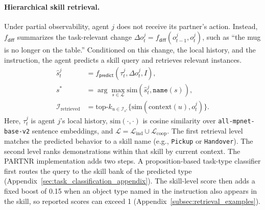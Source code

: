 \documentclass{article}
\theoremstyle{plain}
\theoremstyle{definition}
\theoremstyle{remark}
\begin{document}
\paragraph{Hierarchical skill retrieval.}
Under partial observability, agent $j$ does not receive its partner's action. Instead, $f_{\mathsf{diff}}$ summarizes the task-relevant change $\Delta o_t^j=f_{\mathsf{diff}}(o_{t-1}^j,o_t^j)$, such as ``the mug is no longer on the table.'' Conditioned on this change, the local history, and the instruction, the agent predicts a skill query and retrieves relevant instances.
\begin{equation}
\begin{aligned}
\hat{s}_t^j &= f_{\mathsf{predict}}(\tau_t^j, \Delta o_{t}^j, I), \\
s^* &= \arg\max_{s \in \mathcal{L}} \text{sim}(\hat{s}^j_t, \texttt{name}(s)), \\
\mathcal{I}_{\text{retrieved}} &= \text{top-}k_{u \in \mathcal{I}_{s^*}}
\{\text{sim}(\text{context}(u), o^j_t)\}.
\end{aligned}
\end{equation}
Here, $\tau_t^j$ is agent $j$'s local history, $\text{sim}(\cdot,\cdot)$ is cosine similarity over \texttt{all-mpnet-base-v2} sentence embeddings, and $\mathcal{L}=\mathcal{L}_{\text{ind}}\cup\mathcal{L}_{\text{coop}}$. The first retrieval level matches the predicted behavior to a skill name (e.g., \texttt{Pickup} or \texttt{Handover}). The second level ranks demonstrations within that skill by current context. The PARTNR implementation adds two steps. A proposition-based task-type classifier first routes the query to the skill bank of the predicted type (Appendix~\ref{sec:task_classification_appendix}). The skill-level score then adds a fixed boost of 0.15 when an object type named in the instruction also appears in the skill, so reported scores can exceed 1 (Appendix~\ref{subsec:retrieval_examples}).
 
 
\end{document}
